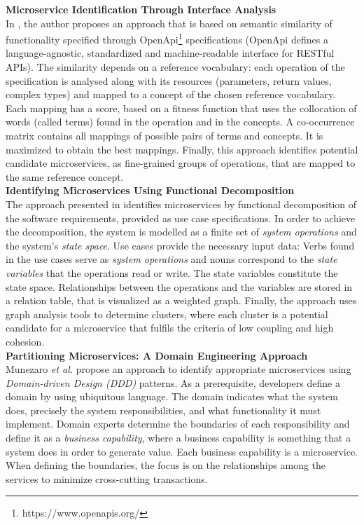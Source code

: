 \noindent
\textbf{Microservice Identification Through Interface Analysis   } \\
In \cite{interfaceAnalysisBaresi}, the author proposes an approach that is based on semantic similarity of functionality specified through OpenApi\footnote{https://www.openapis.org/} specifications (OpenApi defines a language-agnostic, standardized and machine-readable interface for RESTful APIs). The similarity depends on a reference vocabulary: each operation of the specification is analysed along with its resources (parameters, return values, complex types) and mapped to a concept of the chosen reference vocabulary. Each mapping has a score, based on a fitness function that uses the collocation of words (called terms) found in the operation and in the concepts. A co-occurrence matrix contains all mappings of possible pairs of terms and concepts. It is maximized to obtain the best mappings. Finally, this approach identifies potential candidate microservices, as fine-grained groups of operations, that are mapped to the same reference concept. \\


\noindent
\textbf{Identifying Microservices Using Functional Decomposition  } \\
The approach presented in \cite{FunctionalDecompositionHeinrich} identifies microservices by functional decomposition of the software requirements, provided as use case specifications. In order to achieve the decomposition, the system is  modelled as a finite set of \textit{system operations} and the system's \textit{state space}. Use cases provide the necessary input data: Verbs found in the use cases serve as \textit{system operations} and nouns correspond to the \textit{state variables} that the operations read or write. The state variables constitute the state space. Relationships between the operations and the variables are stored in a relation table, that is visualized as a weighted graph. Finally, the approach uses graph analysis tools to determine clusters, where each cluster is a potential candidate for a microservice that fulfils the criteria of low coupling and high cohesion. \\



\noindent
\textbf{Partitioning Microservices: A Domain Engineering Approach } \\
Munezaro \textit{et al.} \cite{DomainEngineeringMunezero} propose an approach to identify appropriate microservices using \textit{Domain-driven Design (DDD)} patterns. As a prerequisite, developers define a domain by using ubiquitous language. The domain indicates what the system does, precisely the system responsibilities, and what functionality it must implement. Domain experts determine the boundaries of each responsibility and define it as a \textit{business capability}, where a business capability is something that a system does in order to generate value. Each business capability is a microservice. When defining the boundaries, the focus is on the relationships among the services to minimize cross-cutting transactions. \\

